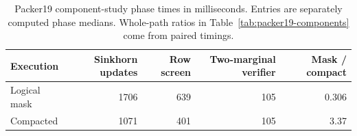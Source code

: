 \begin{table}[!htbp]
\centering
\caption{Packer19 component-study phase times in milliseconds. Entries are separately computed phase medians. Whole-path ratios in Table~\ref{tab:packer19-components} come from paired timings.}
\label{tab:phase-costs}
\small
\setlength{\tabcolsep}{5pt}
\renewcommand{\arraystretch}{1.15}
\begin{tabular}{@{}lrrrr@{}}
\toprule
Execution & Sinkhorn updates & Row screen & Two-marginal verifier & Mask / compact \\
\midrule
Logical mask & 1706 & 639 & 105 & 0.306 \\
Compacted & 1071 & 401 & 105 & 3.37 \\
\bottomrule
\end{tabular}
\end{table}

